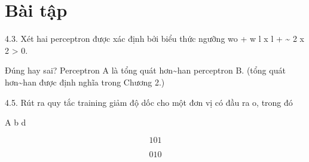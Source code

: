 \section{Bài tập}

4.3. Xét hai perceptron được xác định bởi biểu thức ngưỡng wo + w l x l + \textasciitilde{} 2 x 2 > 0.

Đúng hay sai? Perceptron A là tổng quát hơn\textasciitilde{}han perceptron B. (tổng quát hơn\textasciitilde{}han được định nghĩa trong Chương 2.)

4.5. Rút ra quy tắc training giảm độ dốc cho một đơn vị có đầu ra o, trong đó

A b d

\[1 0 1\]

\[0 1 0\]

